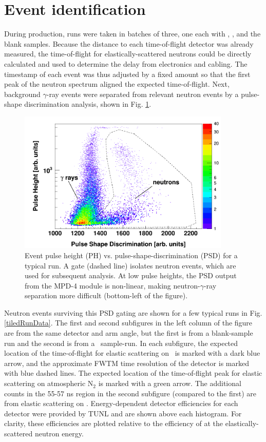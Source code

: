 \section{Event identification}
During production, runs were taken in batches of three, one each with \snTwelve,
\snFour, and the blank samples. Because the distance to each time-of-flight detector
was already measured, the time-of-flight for elastically-scattered neutrons could
be directly calculated and used to determine the delay from electronics and cabling.
The timestamp of each event was thus adjusted by a fixed amount
so that the first peak of the neutron spectrum aligned the expected
time-of-flight. Next, background $\gamma$-ray events were separated from relevant
neutron events by a pulse-shape discrimination analysis, shown in Fig. \ref{PHPSDPlot}.

\begin{figure}[ht]
    \includegraphics[width=0.9\textwidth]{figures/PHPSDPlot.png}
    \caption[Event pulse height (PH) vs. pulse-shape-discrimination (PSD) for
    a typical run]
    {
        Event pulse height (PH) vs. pulse-shape-discrimination (PSD) for
        a typical run. A gate (dashed line) isolates neutron events, which are
        used for subsequent analysis. At low pulse heights, the PSD output from the
        MPD-4 module is non-linear, making neutron-$\gamma$-ray separation more difficult
        (bottom-left of the figure).
    }
    \label{PHPSDPlot}
\end{figure}

Neutron events surviving this PSD gating are shown for a few typical runs in Fig. 
\ref{tiledRunData}. The first and second subfigures in the left column of the figure are from 
the same detector and arm angle, but the first is from a blank-sample run and
the second is from a \snFour\ sample-run. In each subfigure, the expected location
of the time-of-flight for elastic scattering on \snFour\ is marked with a dark blue arrow,
and the approximate FWTM time
resolution of the detector is marked with blue dashed lines. The expected
location of the time-of-flight peak for elastic scattering on atmospheric
N$_{2}$ is marked with a green arrow. The additional counts in the 55-57 ns region in
the second subfigure (compared to the first) are from elastic scattering on
\snFour. Energy-dependent detector efficiencies for each detector were provided by TUNL
and are shown above each histogram. For clarity, these efficiencies are plotted
relative to the efficiency of at the elastically-scattered neutron energy.

